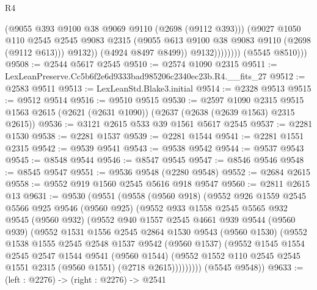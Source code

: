 \begin{lexlean}{R4}
\begin{coremodule}
                            (@9055 @393 @9100 @38 @9069 @9110 (@2698 (@9112 @393)))
                            (@9027
                              @1050
                              @110
                              @2545
                              @2545
                              @9083
                              @2315
                              (@9055 @613 @9100 @38 @9083 @9110 (@2698 (@9112 @613)))
                              @9132))
                          (@4924 @8497 @8499))
                        @9132))))))))
        (@5545 @8510)))
@9508 := @2544 @5617 @2545
@9510 := @2574 @1090 @2315
@9511 := LexLeanPreserve.Cc5b6f2e6d9333bad985206c2340ec23b.R4.__fits_27
@9512 := @2583 @9511
@9513 := LexLeanStd.Blake3.initial
@9514 := @2328 @9513
@9515 := @9512 @9514
@9516 := @9510 @9515
@9530 := @2597
    @1090
    @2315
    @9515
    @1563
    @2615
    (@2621 (@2631 @1090))
    (@2637 (@2638 (@2639 @1563) @2315 @2615))
@9536 := @3121 @2615 @533 @39 @1561 @5617 @2545
@9537 := @2281 @1530
@9538 := @2281 @1537
@9539 := @2281 @1544
@9541 := @2281 @1551 @2315
@9542 := @9539 @9541
@9543 := @9538 @9542
@9544 := @9537 @9543
@9545 := @8548 @9544
@9546 := @8547 @9545
@9547 := @8546 @9546
@9548 := @8545 @9547
@9551 := @9536 @9548 (@2280 @9548)
@9552 := @2684 @2615
@9558 := @9552 @919 @1560 @2545 @5616 @918 @9547
@9560 := @2811 @2615 @13
@9631 := @9530
    (@9551
      (@9558
        (@9560 @918)
        (@9552
          @926
          @1559
          @2545
          @5566
          @925
          @9546
          (@9560 @925)
          (@9552
            @933
            @1558
            @2545
            @5565
            @932
            @9545
            (@9560 @932)
            (@9552
              @940
              @1557
              @2545
              @4661
              @939
              @9544
              (@9560 @939)
              (@9552
                @1531
                @1556
                @2545
                @2864
                @1530
                @9543
                (@9560 @1530)
                (@9552
                  @1538
                  @1555
                  @2545
                  @2548
                  @1537
                  @9542
                  (@9560 @1537)
                  (@9552
                    @1545
                    @1554
                    @2545
                    @2547
                    @1544
                    @9541
                    (@9560 @1544)
                    (@9552 @1552 @110 @2545 @2545 @1551 @2315 (@9560 @1551) (@2718 @2615)))))))))
      (@5545 @9548))
@9633 := (left : @2276) -> (right : @2276) -> @2541

\end{coremodule}
\end{lexlean}
